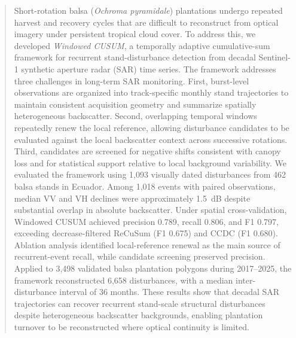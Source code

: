 \documentclass[a4paper,fleqn]{cas-sc}
\begin{document}


\begin{abstract}
  Short-rotation balsa (\textit{Ochroma pyramidale}) plantations undergo repeated harvest and recovery cycles that are difficult to reconstruct from optical imagery under persistent tropical cloud cover. To address this, we developed \textit{Windowed CUSUM}, a temporally adaptive cumulative-sum framework for recurrent stand-disturbance detection from decadal Sentinel-1 synthetic aperture radar (SAR) time series. The framework addresses three challenges in long-term SAR monitoring. First, burst-level observations are organized into track-specific monthly stand trajectories to maintain consistent acquisition geometry and summarize spatially heterogeneous backscatter. Second, overlapping temporal windows repeatedly renew the local reference, allowing disturbance candidates to be evaluated against the local backscatter context across successive rotations. Third, candidates are screened for negative shifts consistent with canopy loss and for statistical support relative to local background variability. We evaluated the framework using 1,093 visually dated disturbances from 462 balsa stands in Ecuador. Among 1,018 events with paired observations, median VV and VH declines were approximately 1.5~dB despite substantial overlap in absolute backscatter. Under spatial cross-validation, Windowed CUSUM achieved precision 0.789, recall 0.806, and F1 0.797, exceeding decrease-filtered ReCuSum (F1 0.675) and CCDC (F1 0.680). Ablation analysis identified local-reference renewal as the main source of recurrent-event recall, while candidate screening preserved precision. Applied to 3,498 validated balsa plantation polygons during 2017--2025, the framework reconstructed 6,658 disturbances, with a median inter-disturbance interval of 36 months. These results show that decadal SAR trajectories can recover recurrent stand-scale structural disturbances despite heterogeneous backscatter backgrounds, enabling plantation turnover to be reconstructed where optical continuity is limited.
\end{abstract}


\end{document}
